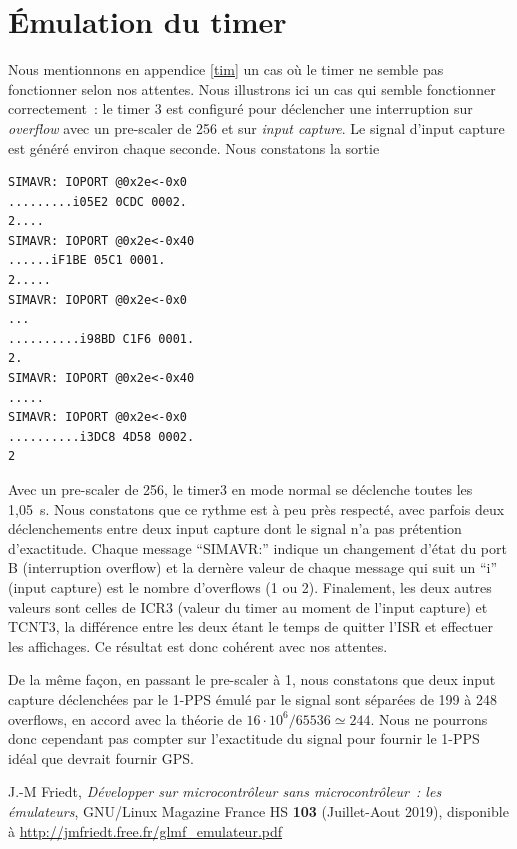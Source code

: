 \documentclass[a4paper]{article}
\begin{document}
\section{\'Emulation du timer}

Nous mentionnons en appendice \ref{tim} un cas o\`u le timer ne semble pas 
fonctionner selon nos attentes. Nous illustrons ici un cas qui semble 
fonctionner correctement~: le timer 3 est configur\'e pour d\'eclencher une 
interruption sur {\em overflow} avec un pre-scaler de 256 et sur {\em input 
capture}. Le signal d'input capture est g\'en\'er\'e environ chaque seconde. 
Nous constatons la sortie
{\footnotesize
\begin{verbatim}
SIMAVR: IOPORT @0x2e<-0x0
.........i05E2 0CDC 0002.
2....
SIMAVR: IOPORT @0x2e<-0x40
......iF1BE 05C1 0001.
2.....
SIMAVR: IOPORT @0x2e<-0x0
...
..........i98BD C1F6 0001.
2.
SIMAVR: IOPORT @0x2e<-0x40
.....
SIMAVR: IOPORT @0x2e<-0x0
..........i3DC8 4D58 0002.
2
\end{verbatim}
}
Avec un pre-scaler de 256, le timer3 en mode normal se d\'eclenche toutes les 
1,05~s. Nous constatons que ce rythme est \`a peu pr\`es respect\'e, avec
parfois deux d\'eclenchements entre deux input capture dont le signal n'a pas
pr\'etention d'exactitude. Chaque message ``SIMAVR:'' indique un changement
d'\'etat du port B (interruption overflow) et la dern\`ere valeur de chaque 
message qui suit un ``i'' (input capture) est le nombre d'overflows (1 ou 2). 
Finalement, les deux autres valeurs sont celles de ICR3 (valeur du timer au 
moment de l'input capture) et TCNT3, la diff\'erence entre les deux \'etant 
le temps de quitter l'ISR et effectuer les affichages. Ce r\'esultat est donc 
coh\'erent avec nos attentes.

De la m\^eme fa\c con, en passant le pre-scaler \`a 1, nous constatons que deux 
input capture d\'eclench\'ees par le 1-PPS \'emul\'e par le signal sont 
s\'epar\'ees de 199 \`a 248 overflows, en accord avec la th\'eorie de 
$16\cdot 10^6/65536\simeq 244$.
Nous ne pourrons donc cependant pas compter sur l'exactitude du signal pour 
fournir le 1-PPS id\'eal que devrait fournir GPS.

\begin{thebibliography}{9}
 J.-M Friedt, {\em D\'evelopper sur microcontr\^oleur sans 
microcontr\^oleur~: les \'emulateurs}, GNU/Linux Magazine France HS {\bf 103} 
(Juillet-Aout 2019), disponible \`a 
\url{http://jmfriedt.free.fr/glmf_emulateur.pdf}
\end{thebibliography}
\end{document}
